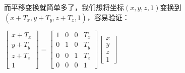 \documentclass[UTF8]{ctexart}
\begin{document}
而平移变换就简单多了，我们想将坐标$(x, y, z, 1)$变换到$(x+T_x, y+T_y, z+T_z, 1)$，容易验证：

$\begin{bmatrix} x+T_x \\ y+T_y \\ z+T_z \\ 1 \end{bmatrix} = \begin{bmatrix}
    1 & 0 & 0 & T_x \\ 
    0 & 1 & 0 & T_y \\ 
    0 & 0 & 1 & T_z \\ 
    0 & 0 & 0 & 1 
    \end{bmatrix} \begin{bmatrix} x \\ y \\ z \\ 1 \end{bmatrix}$
\end{document}
